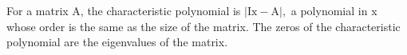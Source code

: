 For a matrix A, the characteristic polynomial is
$ \left | \mathrm{Ix - A} \right | , $ a polynomial in x whose order is the same as
the size of the matrix. The zeros of the characteristic
polynomial are the eigenvalues of the matrix.